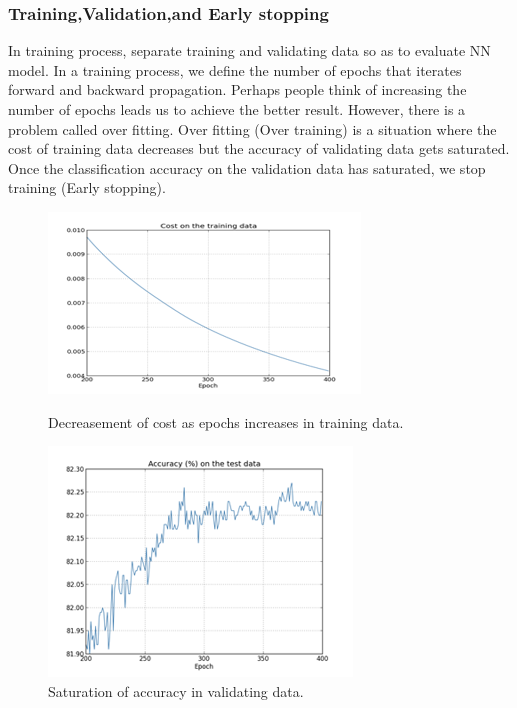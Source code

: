 \documentclass{article}
\begin{document}
\subsubsection{Training,Validation,and Early stopping}
In training process, separate training and validating data so as to evaluate NN model. In a training process, we define the number of epochs that iterates forward and backward propagation. Perhaps people think of increasing the number of epochs leads us to achieve the better result. However, there is a problem called over fitting. Over fitting (Over training) is a situation where the cost of training data decreases but the accuracy of validating data gets saturated.
Once the classification accuracy on the validation data has saturated, we stop training (Early stopping).
\begin{figure}[H]
  \centering
  \begin{minipage}[b]{0.4\textwidth}
    \includegraphics[width=\textwidth]{img/over.png}
    \caption{Decreasement of cost as epochs increases in training data.\protect\cite{NN}}
    \label{over}
  \end{minipage}
  \hfill
  \begin{minipage}[b]{0.4\textwidth}
    \includegraphics[width=\textwidth]{img/over1.png}
    \caption{Saturation of accuracy in validating data.\protect\cite{NN}}
    \label{over1}
  \end{minipage}
\end{figure}
\end{document}

